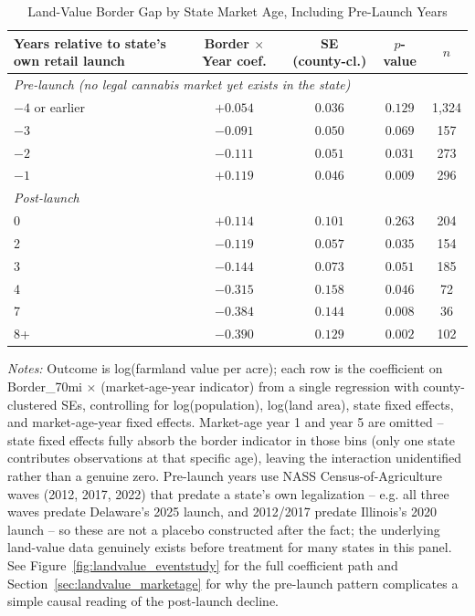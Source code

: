 \begin{table}[htbp]
\centering
\caption{Land-Value Border Gap by State Market Age, Including Pre-Launch Years}
\label{tab:landvalue_marketage}
\begin{tabular}{lcccc}
\toprule
Years relative to state's own retail launch & Border $\times$ Year coef. & SE (county-cl.) & $p$-value & $n$ \\
\midrule
\multicolumn{5}{l}{\textit{Pre-launch (no legal cannabis market yet exists in the state)}} \\
$-4$ or earlier & $+0.054$ & $0.036$ & $0.129$ & 1{,}324 \\
$-3$ & $-0.091$ & $0.050$ & $0.069$ & 157 \\
$-2$ & $-0.111$ & $0.051$ & $0.031$ & 273 \\
$-1$ & $+0.119$ & $0.046$ & $0.009$ & 296 \\
\midrule
\multicolumn{5}{l}{\textit{Post-launch}} \\
0 & $+0.114$ & $0.101$ & $0.263$ & 204 \\
2 & $-0.119$ & $0.057$ & $0.035$ & 154 \\
3 & $-0.144$ & $0.073$ & $0.051$ & 185 \\
4 & $-0.315$ & $0.158$ & $0.046$ & 72 \\
7 & $-0.384$ & $0.144$ & $0.008$ & 36 \\
8+ & $-0.390$ & $0.129$ & $0.002$ & 102 \\
\bottomrule
\end{tabular}
\begin{minipage}{0.95\textwidth}
\vspace{0.3em}
\footnotesize
\textit{Notes:} Outcome is log(farmland value per acre); each row is the coefficient on
Border\_70mi $\times$ (market-age-year indicator) from a single regression with county-clustered SEs,
controlling for log(population), log(land area), state fixed effects, and market-age-year fixed effects.
Market-age year 1 and year 5 are omitted -- state fixed effects fully absorb the border indicator in those
bins (only one state contributes observations at that specific age), leaving the interaction
unidentified rather than a genuine zero. Pre-launch years use NASS Census-of-Agriculture waves (2012,
2017, 2022) that predate a state's own legalization -- e.g. all three waves predate Delaware's 2025
launch, and 2012/2017 predate Illinois's 2020 launch -- so these are not a placebo constructed after the
fact; the underlying land-value data genuinely exists before treatment for many states in this panel. See
Figure~\ref{fig:landvalue_eventstudy} for the full coefficient path and Section~\ref{sec:landvalue_marketage}
for why the pre-launch pattern complicates a simple causal reading of the post-launch decline.
\end{minipage}
\end{table}
